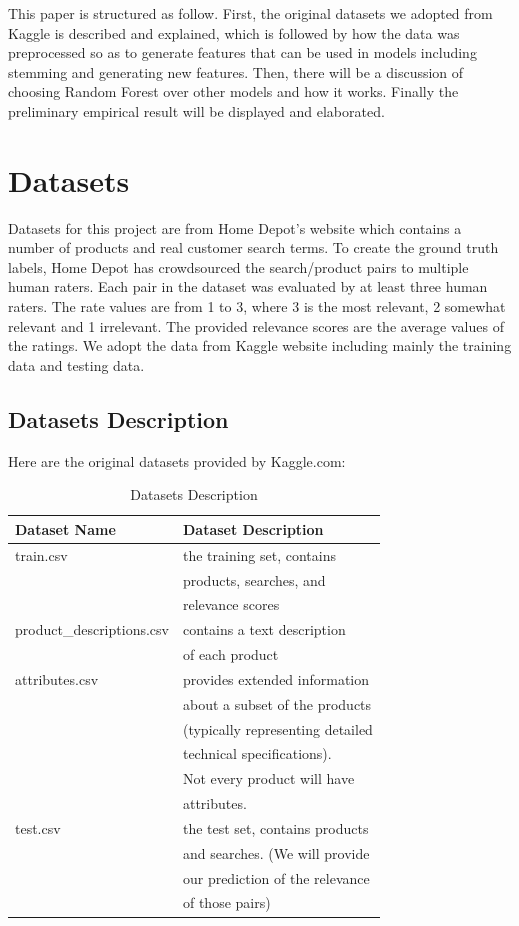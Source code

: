 \documentclass{sig-alternate-05-2015}
\begin{document}
This paper is structured as follow. First, the original datasets we adopted from Kaggle is described and explained, which is followed by how the data was preprocessed so as to generate features that can be used in models including stemming and generating new features. Then, there will be a discussion of choosing Random Forest over other models and how it works. Finally the preliminary empirical result will be displayed and elaborated. 

\section{Datasets}

Datasets for this project are from Home Depot's website which contains a number of products and real customer search terms. To create the ground truth labels, Home Depot has crowdsourced the search/product pairs to multiple human raters. Each pair in the dataset was evaluated by at least three human raters. The rate values are from 1 to 3, where 3 is the most relevant, 2 somewhat relevant and 1 irrelevant. The provided relevance scores are the average values of the ratings. We adopt the data from Kaggle website including mainly the training data and testing data.\\

\subsection{Datasets Description}
Here are the original datasets provided by Kaggle.com:
\begin{table}[ht]
\centering
\caption{Datasets Description}
\label{my-label}
\begin{tabular}{|l|l|}
\hline
\textbf{Dataset Name}  & \textbf{Dataset Description}  \\ \hline
train.csv 		   	  & the training set, contains \\
			           & products, searches, and \\
			           & relevance scores \\ \hline
product\_descriptions.csv & contains a text description \\
				& of each product \\ \hline
attributes.csv      	   & provides extended information \\
 				   & about a subset of the products \\
				   & (typically representing detailed\\
				   &  technical specifications). \\
				   & Not every product will have \\
				   & attributes.\\ \hline
test.csv 	   		&  the test set, contains products \\
				& and searches. (We will provide \\
				& our prediction of the relevance \\
				& of those pairs)\\ \hline
\end{tabular}
\end{table}
\end{document}
